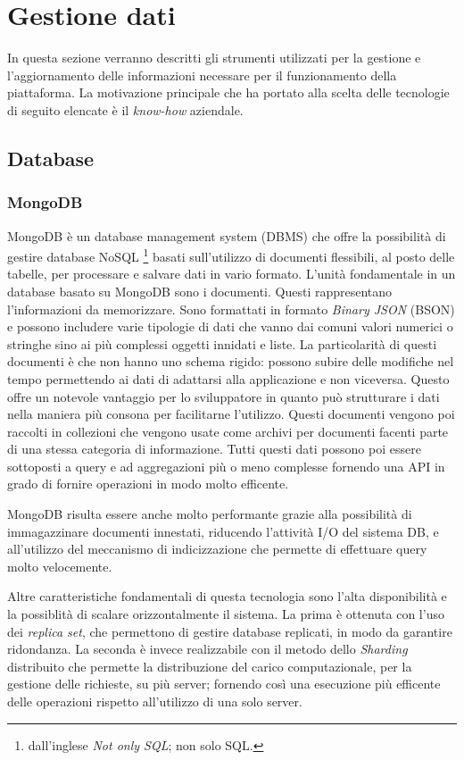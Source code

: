\section{Gestione dati}
In questa sezione verranno descritti gli strumenti utilizzati per la gestione e l'aggiornamento delle informazioni
necessare per il funzionamento della piattaforma.
La motivazione principale che ha portato alla scelta delle tecnologie di seguito elencate è il \textit{know-how} aziendale.
\subsection{Database}
\subsubsection{MongoDB}
MongoDB\cite{MongoDB} è un database management system (DBMS) che offre la possibilità di gestire database NoSQL
\footnote{
    dall'inglese \textit{Not only SQL}; non solo SQL.
} basati sull'utilizzo di documenti flessibili, al posto delle tabelle, per processare e salvare dati in vario formato.\cite{IBM-MongoDB}
L'unità fondamentale in un database basato su MongoDB sono i documenti. Questi rappresentano l'informazioni da memorizzare.
Sono formattati in formato \textit{Binary JSON} (BSON) e possono includere varie tipologie di dati che vanno dai comuni
valori numerici o stringhe sino ai più complessi oggetti innidati e liste.
La particolarità di questi documenti è che non hanno uno schema rigido: possono subire delle modifiche nel tempo permettendo
ai dati di adattarsi alla applicazione e non viceversa. Questo offre un notevole vantaggio per lo sviluppatore
in quanto può strutturare i dati nella maniera più consona per facilitarne l'utilizzo.
Questi documenti vengono poi raccolti in collezioni che vengono usate come archivi per documenti facenti parte di una stessa categoria di informazione.
Tutti questi dati possono poi essere sottoposti a query e ad aggregazioni più o meno complesse fornendo una API in grado di fornire operazioni in modo molto efficente.

MongoDB risulta essere anche molto performante grazie alla possibilità di immagazzinare documenti innestati, riducendo l'attività I/O del sistema DB,
e all'utilizzo del meccanismo di indicizzazione che permette di effettuare query molto velocemente.

Altre caratteristiche fondamentali di questa tecnologia sono l'alta disponibilità e la possiblità di scalare orizzontalmente il sistema.
La prima è ottenuta con l'uso dei \textit{replica set}, che permettono di gestire database replicati, in modo da garantire ridondanza.
La seconda è invece realizzabile con il metodo dello \textit{Sharding} distribuito che permette
la distribuzione del carico computazionale, per la gestione delle richieste, su più server; fornendo così una esecuzione più efficente delle operazioni rispetto all'utilizzo di una solo server.


